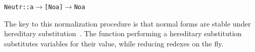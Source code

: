 \documentclass[9pt,preprint,authoryear]{sigplanconf}
\begin{document}
{{{}\vphantom{$\{$}}}\textcolor[rgb]{0,0,0.80}{\texttt{\mbox{\hspace{0.50em}}}}\textcolor[rgb]{0,0,0.80}{\texttt{\mbox{\hspace{0.50em}}}}\textcolor[rgb]{0.70,0.13,0.13}{\texttt{Neutr}}\textcolor[rgb]{0,0,0.80}{\texttt{\mbox{\hspace{0.50em}}}}\textcolor[cmyk]{0,0.65,0.99,0}{\texttt{{:}{:}}}\textcolor[rgb]{0,0,0.80}{\texttt{\mbox{\hspace{0.50em}}}}\textcolor[rgb]{0,0,0.80}{\texttt{a}}\textcolor[rgb]{0,0,0.80}{\texttt{\mbox{\hspace{0.50em}}}}\textcolor[cmyk]{0,0.65,0.99,0}{\texttt{$ \rightarrow $}}\textcolor[rgb]{0,0,0.80}{\texttt{\mbox{\hspace{0.50em}}}}\textcolor[cmyk]{0,0.65,0.99,0}{\texttt{{[}}}\textcolor[rgb]{0,0,0.80}{\texttt{No}}\textcolor[rgb]{0,0,0.80}{\texttt{\mbox{\hspace{0.50em}}}}\textcolor[rgb]{0,0,0.80}{\texttt{a}}\textcolor[cmyk]{0,0.65,0.99,0}{\texttt{{]}}}\textcolor[rgb]{0,0,0.80}{\texttt{\mbox{\hspace{0.50em}}}}\textcolor[cmyk]{0,0.65,0.99,0}{\texttt{$ \rightarrow $}}\textcolor[rgb]{0,0,0.80}{\texttt{\mbox{\hspace{0.50em}}}}\textcolor[rgb]{0,0,0.80}{\texttt{No}}\textcolor[rgb]{0,0,0.80}{\texttt{\mbox{\hspace{0.50em}}}}\textcolor[rgb]{0,0,0.80}{\texttt{a}}\textcolor[rgb]{0,0,0.80}{\texttt{{\nopagebreak \newline%
}\vphantom{$\{$}}}%


%
The key to this normalization procedure is that normal forms
    are stable under hereditary substitution{~}\cite{nanevski-08}.
    The function performing a hereditary substitution substitutes
    variables for their value, while reducing redexes on the fly.%


{\nopagebreak }
\end{document}
